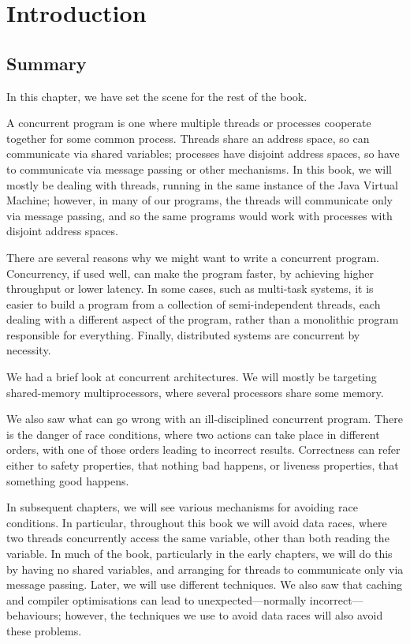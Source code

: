 \chapter{Introduction}
\label{chap:intro}





\section{Summary}

In this chapter, we have set the scene for the rest of the book.

A concurrent program is one where multiple threads or processes cooperate
together for some common process.  Threads share an address space, so can
communicate via shared variables; processes have disjoint address spaces, so
have to communicate via message passing or other mechanisms.  In this book, we
will mostly be dealing with threads, running in the same instance of the Java
Virtual Machine; however, in many of our programs, the threads will
communicate only via message passing, and so the same programs would work with
processes with disjoint address spaces.

There are several reasons why we might want to write a concurrent program.
Concurrency, if used well, can make the program faster, by achieving higher
throughput or lower latency.  In some cases, such as multi-task systems, it
is easier to build a program from a collection of semi-independent threads,
each dealing with a different aspect of the program, rather than a monolithic
program responsible for everything.  Finally, distributed systems are
concurrent by necessity.

We had a brief look at concurrent architectures.  We will mostly be targeting
shared-memory multiprocessors, where several processors share some memory.  

We also saw what can go wrong with an ill-disciplined concurrent program.
There is the danger of race conditions, where two actions can take place in
different orders, with one of those orders leading to incorrect results.  
Correctness can refer either to safety properties, that nothing bad happens,
or liveness properties, that something good happens. 

In subsequent chapters, we will see various mechanisms for avoiding race
conditions.  In particular, throughout this book we will avoid data races,
where two threads concurrently access the same variable, other than both
reading the variable.  In much of the book, particularly in the early
chapters, we will do this by having no shared variables, and arranging for
threads to communicate only via message passing.  Later, we will use different
techniques.  We also saw that caching and compiler optimisations can lead to
unexpected---normally incorrect---behaviours; however, the techniques we use
to avoid data races will also avoid these problems.



